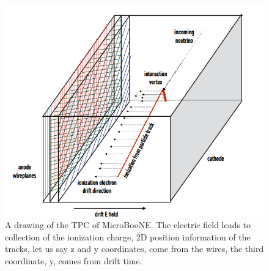 \documentclass[a4paper]{article}\linespread{1.4}
\begin{document}
\begin{figure}[h!] \centering \includegraphics[width=120mm,scale=1.0]{figures/mbtpc.png} \caption{A drawing of the TPC of MicroBooNE. The electric field leads to collection of the ionization charge, 2D position information of the tracks, let us say z and y coordinates, come from the wires, the third coordinate, y, comes from drift time. \cite{PP}} \label{fig:mbtpc}\end{figure}  
\end{document}
